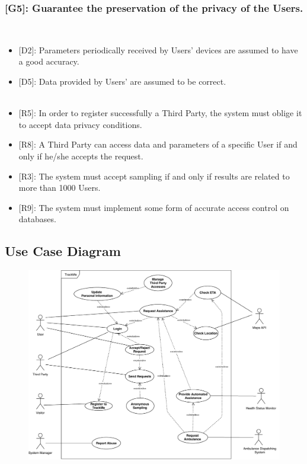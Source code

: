 \documentclass[12pt,a4paper]{article}
\begin{document}
	\subsubsection*{{[}{G5}{]}: Guarantee the preservation of the privacy of the Users.}
	\begin{itemize}\\
		\begin{itemize}
			\item {[D2]}: Parameters periodically received by Users' devices are assumed to have a good accuracy. 
			\item {[D5]}: Data provided by Users' are assumed to be correct. 
			\\ \\
			\item {[R5]}: In order to register successfully a Third Party, the system must oblige it to accept data privacy conditions.
			\item {[R8]}: A Third Party can access data and parameters of a specific User if and only if he/she accepts the request.
			\item {[R3]}: The system must accept sampling if and only if results are related to more than 1000 Users.
			\item {[R9]}: The system must implement some form of accurate access control on databases.
		\end{itemize}
	\end{itemize}
	
	\newpage
	\subsection{Use Case Diagram}
	\begin{figure}[h]
		\centering
		\includegraphics[width=1.25\linewidth]{Images/use_case_diagram}
		\label{fig:use_case_diagram}
	\end{figure}
	
\end{document}
